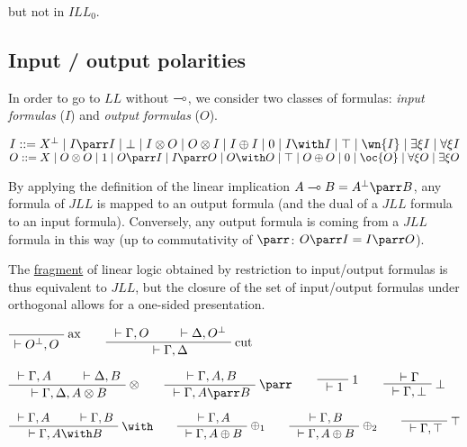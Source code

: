 but not in \(ILL_0\).

\subsection{Input / output polarities}\label{input-output-polarities}

In order to go to \(LL\) without \(\multimap\), we consider two classes of
formulas: \emph{input formulas} (\(I\)) and \emph{output formulas}
(\(O\)).

\(I ::= X\orth \mid I\parr I \mid \bot \mid I\tens O \mid O\tens I \mid I\plus I \mid \zero \mid I\with I \mid \top \mid \wn{I} \mid \exists\xi I \mid \forall\xi I\)
\(O ::= X \mid O\tens O \mid \one \mid O\parr I \mid I\parr O \mid O\with O \mid \top \mid O\plus O \mid \zero \mid \oc{O} \mid \forall\xi O \mid \exists\xi O\)

By applying the definition of the linear implication
\(A\limp B = A\orth\parr B\), any formula of \(JLL\) is mapped to an
output formula (and the dual of a \(JLL\) formula to an input formula).
Conversely, any output formula is coming from a \(JLL\) formula in this
way (up to commutativity of \(\parr\): \(O\parr I = I\parr O\)).

The \url{fragment} of linear logic obtained by restriction to
input/output formulas is thus equivalent to \(JLL\), but the closure of
the set of input/output formulas under orthogonal allows for a one-sided
presentation.

\(\LabelRule{\rulename{ax}}
\NulRule{\vdash O\orth,O}
\DisplayProof
\qquad
\AxRule{{}\vdash \Gamma,O}
\AxRule{{}\vdash\Delta,O\orth}
\LabelRule{\rulename{cut}}
\BinRule{{}\vdash\Gamma,\Delta}
\DisplayProof\)

\(\AxRule{{}\vdash\Gamma,A}
\AxRule{{}\vdash\Delta,B}
\LabelRule{\tens}
\BinRule{{}\vdash\Gamma,\Delta,A\tens B}
\DisplayProof
\qquad
\AxRule{{}\vdash\Gamma,A,B}
\LabelRule{\parr}
\UnaRule{{}\vdash\Gamma,A\parr B}
\DisplayProof
\qquad
\LabelRule{\one}
\NulRule{{}\vdash\one}
\DisplayProof
\qquad
\AxRule{{}\vdash\Gamma}
\LabelRule{\bot}
\UnaRule{{}\vdash\Gamma,\bot}
\DisplayProof\)

\(\AxRule{{}\vdash\Gamma,A}
\AxRule{{}\vdash\Gamma,B}
\LabelRule{\with}
\BinRule{{}\vdash\Gamma,A\with B}
\DisplayProof
\qquad
\AxRule{{}\vdash\Gamma,A}
\LabelRule{\plus_1}
\UnaRule{{}\vdash\Gamma,A\plus B}
\DisplayProof
\qquad
\AxRule{{}\vdash\Gamma,B}
\LabelRule{\plus_2}
\UnaRule{{}\vdash\Gamma,A\plus B}
\DisplayProof
\qquad
\LabelRule{\top}
\NulRule{{}\vdash\Gamma,\top}
\DisplayProof\)

